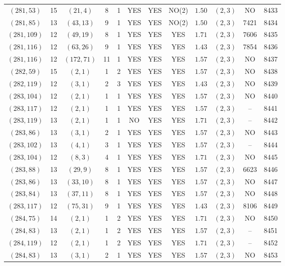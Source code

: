 \begin{longtable}{|c|c|c|c|c|c|c|c|c|c|c|c|}
$(281,53)$ & 15 & $(21,4)$ & 8 & 1 & YES & YES & NO(2) & $1.50$ & $(2,3)$ & NO & 8433\\
$(281,85)$ & 13 & $(43,13)$ & 9 & 1 & YES & YES & NO(2) & $1.50$ & $(2,3)$ & 7421 & 8434\\
$(281,109)$ & 12 & $(49,19)$ & 8 & 1 & YES & YES & YES & $1.71$ & $(2,3)$ & 7606 & 8435\\
$(281,116)$ & 12 & $(63,26)$ & 9 & 1 & YES & YES & YES & $1.43$ & $(2,3)$ & 7854 & 8436\\
$(281,116)$ & 12 & $(172,71)$ & 11 & 1 & YES & YES & YES & $1.57$ & $(2,3)$ & NO & 8437\\
$(282,59)$ & 15 & $(2,1)$ & 1 & 2 & YES & YES & YES & $1.57$ & $(2,3)$ & NO & 8438\\
$(282,119)$ & 12 & $(3,1)$ & 2 & 3 & YES & YES & YES & $1.43$ & $(2,3)$ & NO & 8439\\
$(283,104)$ & 12 & $(2,1)$ & 1 & 1 & YES & YES & YES & $1.57$ & $(2,3)$ & NO & 8440\\
$(283,117)$ & 12 & $(2,1)$ & 1 & 1 & YES & YES & YES & $1.57$ & $(2,3)$ & -- & 8441\\
$(283,119)$ & 13 & $(2,1)$ & 1 & 1 & NO & YES & YES & $1.71$ & $(2,3)$ & -- & 8442\\
$(283,86)$ & 13 & $(3,1)$ & 2 & 1 & YES & YES & YES & $1.57$ & $(2,3)$ & NO & 8443\\
$(283,102)$ & 13 & $(4,1)$ & 3 & 1 & YES & YES & YES & $1.57$ & $(2,3)$ & -- & 8444\\
$(283,104)$ & 12 & $(8,3)$ & 4 & 1 & YES & YES & YES & $1.71$ & $(2,3)$ & NO & 8445\\
$(283,88)$ & 13 & $(29,9)$ & 8 & 1 & YES & YES & YES & $1.57$ & $(2,3)$ & 6623 & 8446\\
$(283,86)$ & 13 & $(33,10)$ & 8 & 1 & YES & YES & YES & $1.57$ & $(2,3)$ & NO & 8447\\
$(283,84)$ & 13 & $(37,11)$ & 8 & 1 & YES & YES & YES & $1.57$ & $(2,3)$ & NO & 8448\\
$(283,117)$ & 12 & $(75,31)$ & 9 & 1 & YES & YES & YES & $1.43$ & $(2,3)$ & 8106 & 8449\\
$(284,75)$ & 14 & $(2,1)$ & 1 & 2 & YES & YES & YES & $1.71$ & $(2,3)$ & NO & 8450\\
$(284,83)$ & 13 & $(2,1)$ & 1 & 2 & YES & YES & YES & $1.57$ & $(2,3)$ & -- & 8451\\
$(284,119)$ & 12 & $(2,1)$ & 1 & 2 & YES & YES & YES & $1.71$ & $(2,3)$ & -- & 8452\\
$(284,83)$ & 13 & $(3,1)$ & 2 & 1 & YES & YES & YES & $1.57$ & $(2,3)$ & NO & 8453\\

\end{longtable}
